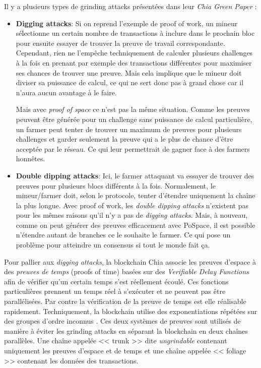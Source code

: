 Il y a plusieurs types de grinding attacks présentées dans leur \emph{Chia Green Paper} \cite{chia:greenpaper} :

\begin{itemize}
  \item \textbf{Digging attacks}: Si on reprend l'exemple de proof of work, un mineur sélectionne un certain nombre de transactions à inclure dans le prochain bloc pour ensuite essayer de trouver la preuve de travail correspondante. Cependant, rien ne l'empêche techniquement de calculer plusieurs challenges à la fois en prenant par exemple des transactions différentes pour maximiser ses chances de trouver une preuve. Mais cela implique que le mineur doit diviser sa puissance de calcul, ce qui ne sert donc pas à grand chose car il n'aura aucun avantage à le faire.
  
  Mais avec \emph{proof of space} ce n'est pas la même situation. Comme les preuves peuvent être générée pour un challenge sans puissance de calcul particulière, un farmer peut tenter de trouver un maximum de preuves pour plusieurs challenges et garder seulement la preuve qui a le plus de chance d'être acceptée par le réseau. Ce qui leur permettrait de gagner face à des farmers honnêtes.
  \item \textbf{Double dipping attacks}: Ici, le farmer attaquant va essayer de trouver des preuves pour plusieurs blocs différents à la fois. Normalement, le mineur/farmer doit, selon le protocole, tenter d'étendre uniquement la chaîne la plus longue. Avec proof of work, les \emph{double dipping attacks} n'existent pas pour les mêmes raisons qu'il n'y a pas de \emph{digging attacks}. Mais, à nouveau, comme on peut générer des preuves efficacement avec PoSpace, il est possible n'étendre autant de branches ce le souhaite le farmer. Ce qui pose un problème pour atteindre un consensus si tout le monde fait ça. 
\end{itemize}

Pour pallier aux \emph{digging attacks}, la blockchain Chia associe les preuves d'espace à des \emph{preuves de temps} (proofs of time) basées sur des \emph{Verifiable Delay Functions} afin de vérifier qu'un certain temps s'est réellement écoulé. Ces fonctions particulières prennent un temps réel à s'exécuter et ne peuvent pas être parallélisées. Par contre la vérification de la preuve de temps est elle réalisable rapidement. Techniquement, la blockchain utilise des exponentiations répétées sur des groupes d'ordre inconnus \cite{DBLP:conf/crypto/BonehBBF18} \cite{DBLP:conf/innovations/Pietrzak19a} \cite{DBLP:conf/eurocrypt/Wesolowski19}. Ces deux systèmes de preuves sont utilisés de manière à éviter les grinding attacks en séparant la blockchain en deux chaînes parallèles. Une chaîne appelée << trunk >> dite \emph{ungrindable} contenant uniquement les preuves d'espace et de temps et une chaîne appelée << foliage >> contenant les données des transactions.

